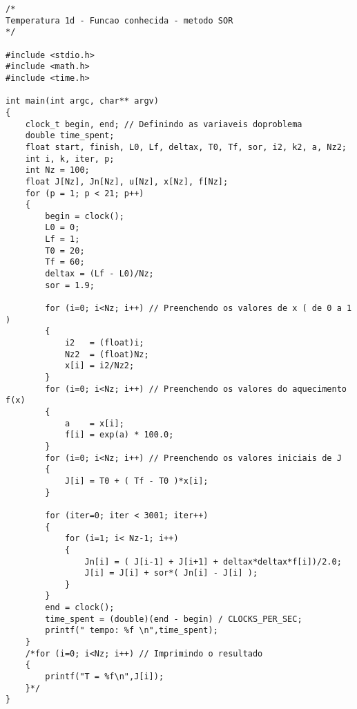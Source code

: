 \lstset{language=c}
\begin{lstlisting}
/*
Temperatura 1d - Funcao conhecida - metodo SOR
*/

#include <stdio.h>
#include <math.h> 
#include <time.h>

int main(int argc, char** argv)
{
	clock_t begin, end; // Definindo as variaveis doproblema
	double time_spent;
	float start, finish, L0, Lf, deltax, T0, Tf, sor, i2, k2, a, Nz2;
	int i, k, iter, p;
	int Nz = 100;
	float J[Nz], Jn[Nz], u[Nz], x[Nz], f[Nz];
	for (p = 1; p < 21; p++)
	{
		begin = clock();
		L0 = 0;
		Lf = 1;
		T0 = 20;
		Tf = 60;
		deltax = (Lf - L0)/Nz; 
		sor = 1.9;

		for (i=0; i<Nz; i++) // Preenchendo os valores de x ( de 0 a 1 )
		{
			i2   = (float)i;
			Nz2  = (float)Nz;
			x[i] = i2/Nz2;
		}
		for (i=0; i<Nz; i++) // Preenchendo os valores do aquecimento f(x)
		{
			a    = x[i];
			f[i] = exp(a) * 100.0;
		}
		for (i=0; i<Nz; i++) // Preenchendo os valores iniciais de J 
		{
			J[i] = T0 + ( Tf - T0 )*x[i];
		}

		for (iter=0; iter < 3001; iter++)
		{
			for (i=1; i< Nz-1; i++)
			{
				Jn[i] = ( J[i-1] + J[i+1] + deltax*deltax*f[i])/2.0;
				J[i] = J[i] + sor*( Jn[i] - J[i] );
			}
		}
		end = clock();
		time_spent = (double)(end - begin) / CLOCKS_PER_SEC;
		printf(" tempo: %f \n",time_spent);
	}
	/*for (i=0; i<Nz; i++) // Imprimindo o resultado
	{
		printf("T = %f\n",J[i]);
	}*/
}
\end{lstlisting}
